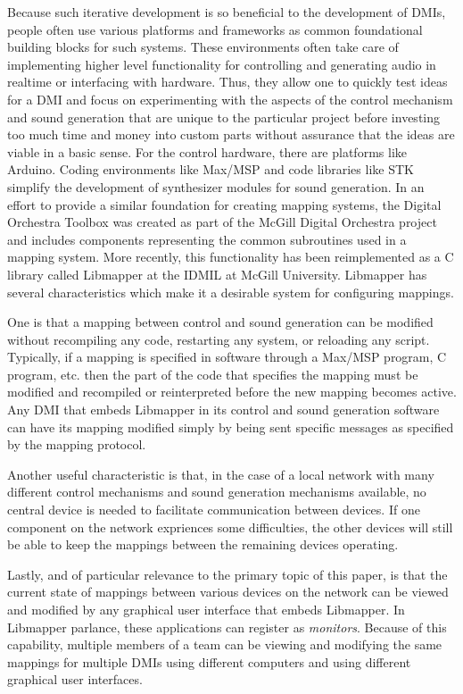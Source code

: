 Because such iterative development is so beneficial to the development of DMIs, people often use various platforms and frameworks as common foundational building blocks for such systems. These environments often take care of implementing higher level functionality for controlling and generating audio in realtime or interfacing with hardware. Thus, they allow one to quickly test ideas for a DMI and focus on experimenting with the aspects of the control mechanism and sound generation that are unique to the particular project before investing too much time and money into custom parts without assurance that the ideas are viable in a basic sense. For the control hardware, there are platforms like Arduino. Coding environments like Max/MSP and code libraries like STK simplify the development of synthesizer modules for sound generation. In an effort to provide a similar foundation for creating mapping systems, the Digital Orchestra Toolbox was created as part of the McGill Digital Orchestra project and includes components representing the common subroutines used in a mapping system. More recently, this functionality has been reimplemented as a C library called Libmapper at the IDMIL at McGill University. Libmapper has several characteristics which make it a desirable system for configuring mappings. 

One is that a mapping between control and sound generation can be modified without recompiling any code, restarting any system, or reloading any script. Typically, if a mapping is specified in software through a Max/MSP program, C program, etc. then the part of the code that specifies the mapping must be modified and recompiled or reinterpreted before the new mapping becomes active. Any DMI that embeds Libmapper in its control and sound generation software can have its mapping modified simply by being sent specific messages as specified by the mapping protocol. 

Another useful characteristic is that, in the case of a local network with many different control mechanisms and sound generation mechanisms available, no central device is needed to facilitate communication between devices. If one component on the network expriences some difficulties, the other devices will still be able to keep the mappings between the remaining devices operating.  

Lastly, and of particular relevance to the primary topic of this paper, is that the current state of mappings between various devices on the network can be viewed and modified by any graphical user interface that embeds Libmapper. In Libmapper parlance, these applications can register as \emph{monitors}. Because of this capability, multiple members of a team can be viewing and modifying the same mappings for multiple DMIs using different computers and using different graphical user interfaces.  

